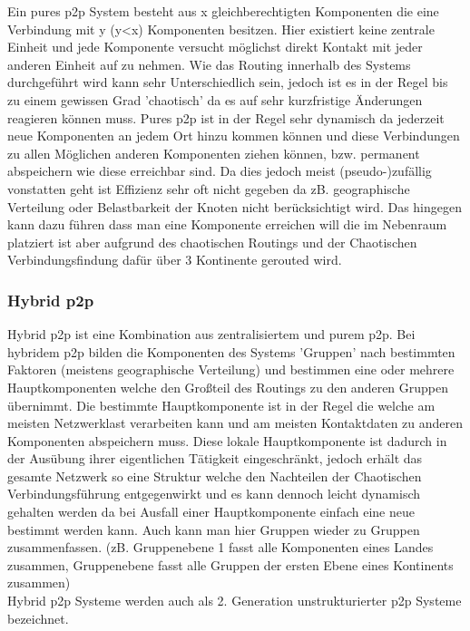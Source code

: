 \documentclass[a4paper,12pt]{scrreprt}
\begin{document}
					Ein pures p2p System besteht aus x gleichberechtigten Komponenten die eine Verbindung mit y (y<x) Komponenten besitzen. Hier existiert keine zentrale Einheit und jede Komponente versucht möglichst direkt Kontakt mit jeder anderen Einheit auf zu nehmen. Wie das Routing innerhalb des Systems durchgeführt wird kann sehr Unterschiedlich sein, jedoch ist es in der Regel bis zu einem gewissen Grad 'chaotisch' da es auf sehr kurzfristige Änderungen reagieren können muss. Pures p2p ist in der Regel sehr dynamisch da jederzeit neue Komponenten an jedem Ort hinzu kommen können und diese Verbindungen zu allen Möglichen anderen Komponenten ziehen können, bzw. permanent abspeichern wie diese erreichbar sind. Da dies jedoch meist (pseudo-)zufällig vonstatten geht ist Effizienz sehr oft nicht gegeben da zB. geographische Verteilung oder Belastbarkeit der Knoten nicht berücksichtigt wird. Das hingegen kann dazu führen dass man eine Komponente erreichen will die im Nebenraum platziert ist aber aufgrund des chaotischen Routings und der Chaotischen Verbindungsfindung dafür über 3 Kontinente gerouted wird.
					
				\subsubsection{Hybrid p2p}
				
					Hybrid p2p ist eine Kombination aus zentralisiertem und purem p2p. Bei hybridem p2p bilden die Komponenten des Systems 'Gruppen' nach bestimmten Faktoren (meistens geographische Verteilung) und bestimmen eine oder mehrere Hauptkomponenten welche den Großteil des Routings zu den anderen Gruppen übernimmt. Die bestimmte Hauptkomponente ist in der Regel die welche am meisten Netzwerklast verarbeiten kann und am meisten Kontaktdaten zu anderen Komponenten abspeichern muss. Diese lokale Hauptkomponente ist dadurch in der Ausübung ihrer eigentlichen Tätigkeit eingeschränkt, jedoch erhält das gesamte Netzwerk so eine Struktur welche den Nachteilen der Chaotischen Verbindungsführung entgegenwirkt und es kann dennoch leicht dynamisch gehalten werden da bei Ausfall einer Hauptkomponente einfach eine neue bestimmt werden kann. Auch kann man hier Gruppen wieder zu Gruppen zusammenfassen. (zB. Gruppenebene 1 fasst alle Komponenten eines Landes zusammen, Gruppenebene fasst alle Gruppen der ersten Ebene eines Kontinents zusammen)\\
					Hybrid p2p Systeme werden auch als 2. Generation unstrukturierter p2p Systeme bezeichnet.
					
\end{document}

